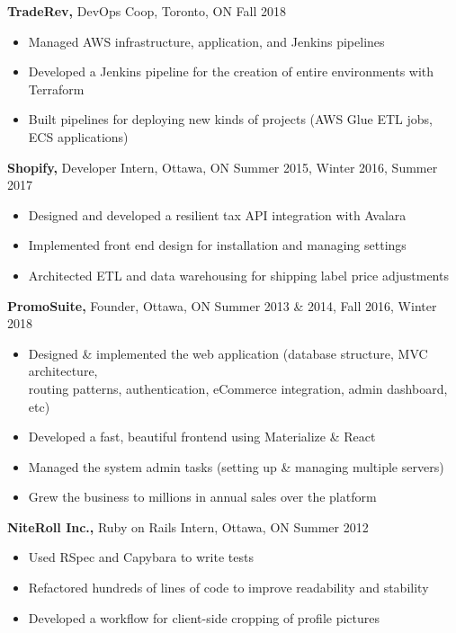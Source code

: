 \documentclass[line, centered]{res}
\begin{document}
\begin{resume}
 {\bf TradeRev,} DevOps Coop, Toronto, ON \hfill Fall 2018\\[-8pt]
 \begin{itemize} \itemsep -2pt  %
    \item Managed AWS infrastructure, application, and Jenkins pipelines
    \item Developed a Jenkins pipeline for the creation of entire environments with Terraform
    \item Built pipelines for deploying new kinds of projects (AWS Glue ETL jobs, ECS applications)
 \end{itemize}

 {\bf Shopify,} Developer Intern, Ottawa, ON \hfill Summer 2015, Winter 2016, Summer 2017\\[-8pt]
 \begin{itemize} \itemsep -2pt  %
    \item Designed and developed a resilient tax API integration with Avalara
    \item Implemented front end design for installation and managing settings
    \item Architected ETL and data warehousing for shipping label price adjustments
 \end{itemize}

 {\bf PromoSuite,} Founder, Ottawa, ON \hfill Summer 2013 \& 2014, Fall 2016, Winter 2018\\[-8pt]
 \begin{itemize} \itemsep -2pt  %
    \item Designed \& implemented the web application (database structure, MVC architecture,\\
            routing patterns, authentication, eCommerce integration, admin dashboard, etc)
    \item Developed a fast, beautiful frontend using Materialize \& React
    \item Managed the system admin tasks (setting up \& managing multiple servers)
    \item Grew the business to millions in annual sales over the platform
 \end{itemize}


{\bf NiteRoll Inc.,} Ruby on Rails Intern, Ottawa, ON \hfill Summer 2012
\begin{itemize} \itemsep -2pt
	\item Used RSpec and Capybara to write tests
    \item Refactored hundreds of lines of code to improve readability and stability
    \item Developed a workflow for client-side cropping of profile pictures
\end{itemize}



\end{resume}
\end{document}
